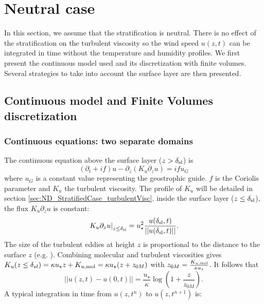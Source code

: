 \section{Neutral case}
In this section, we assume that the stratification is neutral.
There is no effect of the stratification on the turbulent viscosity
so the wind speed $u(z, t)$ can be integrated in time
without the temperature and humidity profiles.
We first present the continuous model used and its
discretization with finite volumes. Several strategies to
take into account the surface layer are then presented.
\subsection{Continuous model and Finite Volumes discretization}
\subsubsection{Continuous equations: two separate domains}
\label{sec:ND_NeutralCase}
The continuous equation above the surface layer
($z > \delta_{\rm sl}$) is
\begin{equation}
	\label{eq:ND_NeutralCase_EkmanEq}
  (\partial_t + if) u - \partial_z (K_u \partial_z u) = if u_G
\end{equation}
where $u_G$ is a constant value representing the geostrophic guide.
$f$ is the Coriolis parameter and $K_u$ the turbulent viscosity.
The profile of $K_u$ will be detailed
in section \ref{sec:ND_StratifiedCase_turbulentVisc}.
inside the surface layer ($z \leq \delta_{\rm sl}$), the flux
$K_u \partial_z u$ is constant:
\begin{equation}
	\label{eq:ND_NeutralCase_constantFlux}
	\left.K_u \partial_z u \right|_{z\leq \delta_{\rm sl}}
	= u_\star^2
	\frac{u(\delta_{\rm sl}, t)}{||u(\delta_{\rm sl}, t)||}.
\end{equation}
The size of the turbulent eddies at height $z$
is proportional to the distance to the surface $z$
(e.g. \cite{kawai2012wall}). Combining molecular and
turbulent viscosities gives 
$K_u(z\leq \delta_{sl}) = \kappa u_\star z + K_{u, {\rm mol}}
= \kappa u_\star (z + z_{0M})$ with $z_{0M} = \frac{K_{u, {\rm mol}}}{\kappa u_\star}$.
It follows that
\begin{equation}
\label{eq:ND_NeutralCase_WallLaw}
	||u(z, t) - u(0, t)|| = \frac{{u_\star}}{\kappa}
	\log(1+\frac{z}{z_{0M}}).
\end{equation}
A typical integration in time from $u(z, t^{n})$ to
$u(z, t^{n+1})$ is:
